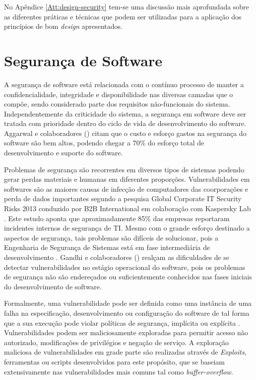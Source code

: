 No Apêndice \ref{Att:design-security} tem-se uma discussão mais aprofundada sobre as diferentes práticas e técnicas que podem ser utilizadas para a aplicação dos princípios de bom \emph{design} apresentados.


\section{Segurança de Software}
\label{sec-metrics-security}

A segurança de software está relacionada com o contínuo processo de manter a confidencialidade, integridade e disponibilidade nas diversas camadas que o compõe, sendo considerado parte dos requisitos não-funcionais do sistema. Independentemente da criticidade do sistema, a segurança em software deve ser tratada com prioridade dentro do ciclo de vida de desenvolvimento do software. Aggarwal e colaboradores (\citeyear{aggarwal2002}) citam que o custo e esforço gastos na segurança do software são bem altos, podendo chegar a 70\% do esforço total de desenvolvimento e suporte do software.

%

Problemas de segurança são recorrentes em diversos tipos de sistemas podendo gerar perdas materiais e humanas em diferentes proporções. Vulnerabilidades em softwares são as maiores causas de infecção de computadores das coorporações e perda de dados importantes segundo a pesquisa Global Corporate IT Security Risks 2013 conduzido por B2B International em colaboração com Kaspersky Lab \cite{b2binternational2013}. Este estudo aponta que aproximadamente 85\% das empresas reportaram incidentes internos de segurança de TI. Mesmo com o grande esforço destinado a aspectos de segurança, tais problemas são difíceis de solucionar, pois a Engenharia de Segurança de Sistemas está em fase intermediária de desenvolvimento \cite{pascoa2002}. Gandhi e colaboradores (\citeyear{gandhi2013}) realçam as dificuldades de se detectar vulnerabilidades no estágio operacional do software, pois os problemas de segurança não são endereçados ou suficientemente conhecidos nas fases iniciais do desenvolvimento de software. 

%

Formalmente, uma vulnerabilidade pode ser definida como uma instância de uma falha na especificação, desenvolvimento ou configuração do software de tal forma que a sua execução pode violar políticas de segurança, implícita ou explícita \cite{krsul1998}. Vulnerabilidades podem ser maliciosamente exploradas para permitir acesso não autorizado, modificações de privilégios e negação de serviço. A exploração maliciosa de vulnerabilidades em grade parte são realizadas através de \emph{Exploits}, ferramentas ou scripts desenvolvidos para este propósito, que se baseiam extensivamente nas vulnerabilidades mais comuns tal como \emph{buffer-overflow}. 

